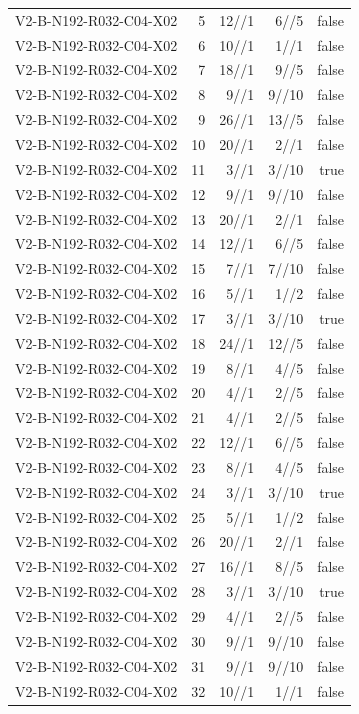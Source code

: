 {\begin{longtable}{lrrrr}
V2-B-N192-R032-C04-X02 & 5 & 12//1 & 6//5 & false \\
V2-B-N192-R032-C04-X02 & 6 & 10//1 & 1//1 & false \\
V2-B-N192-R032-C04-X02 & 7 & 18//1 & 9//5 & false \\
V2-B-N192-R032-C04-X02 & 8 & 9//1 & 9//10 & false \\
V2-B-N192-R032-C04-X02 & 9 & 26//1 & 13//5 & false \\
V2-B-N192-R032-C04-X02 & 10 & 20//1 & 2//1 & false \\
V2-B-N192-R032-C04-X02 & 11 & 3//1 & 3//10 & true \\
V2-B-N192-R032-C04-X02 & 12 & 9//1 & 9//10 & false \\
V2-B-N192-R032-C04-X02 & 13 & 20//1 & 2//1 & false \\
V2-B-N192-R032-C04-X02 & 14 & 12//1 & 6//5 & false \\
V2-B-N192-R032-C04-X02 & 15 & 7//1 & 7//10 & false \\
V2-B-N192-R032-C04-X02 & 16 & 5//1 & 1//2 & false \\
V2-B-N192-R032-C04-X02 & 17 & 3//1 & 3//10 & true \\
V2-B-N192-R032-C04-X02 & 18 & 24//1 & 12//5 & false \\
V2-B-N192-R032-C04-X02 & 19 & 8//1 & 4//5 & false \\
V2-B-N192-R032-C04-X02 & 20 & 4//1 & 2//5 & false \\
V2-B-N192-R032-C04-X02 & 21 & 4//1 & 2//5 & false \\
V2-B-N192-R032-C04-X02 & 22 & 12//1 & 6//5 & false \\
V2-B-N192-R032-C04-X02 & 23 & 8//1 & 4//5 & false \\
V2-B-N192-R032-C04-X02 & 24 & 3//1 & 3//10 & true \\
V2-B-N192-R032-C04-X02 & 25 & 5//1 & 1//2 & false \\
V2-B-N192-R032-C04-X02 & 26 & 20//1 & 2//1 & false \\
V2-B-N192-R032-C04-X02 & 27 & 16//1 & 8//5 & false \\
V2-B-N192-R032-C04-X02 & 28 & 3//1 & 3//10 & true \\
V2-B-N192-R032-C04-X02 & 29 & 4//1 & 2//5 & false \\
V2-B-N192-R032-C04-X02 & 30 & 9//1 & 9//10 & false \\
V2-B-N192-R032-C04-X02 & 31 & 9//1 & 9//10 & false \\
V2-B-N192-R032-C04-X02 & 32 & 10//1 & 1//1 & false \\

\end{longtable}}
